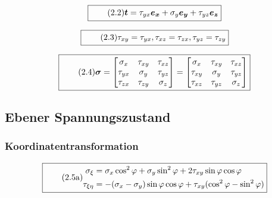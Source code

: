 \documentclass[11pt]{article}
\newcommand{\1}{ {\mathds{1}} }
\begin{document}
\begin{multicols}{2}
		\begin{equation}
			\boxed{
				\tag{2.2}
				\begin{split}
					\boldsymbol{t}
					=
					\tau_{yx} \boldsymbol{e_x}
					+
					\sigma_y	\boldsymbol{e_y}
					+
					\tau_{yz} \boldsymbol{e_z}
				\end{split}
			}
		\end{equation}

		\begin{equation}
			\boxed{
				\tag{2.3}
				\begin{split}
					\tau_{xy} = \tau_{yx},
					\tau_{xz} = \tau_{zx},
					\tau_{yz} = \tau_{zy}
				\end{split}
			}
		\end{equation}
		
		\begin{equation}
			\boxed{
				\tag{2.4}
				\begin{split}
					\boldsymbol{\sigma}
					=
					\begin{bmatrix*}
						\sigma_{x} & \tau_{xy}	& \tau_{xz} \\
						\tau_{yx}	& \sigma_{y} & \tau_{yz} \\
						\tau_{zx}	& \tau_{zy}	& \sigma_{z}
					\end{bmatrix*}
					=
					\begin{bmatrix*}
						\sigma_{x} & \tau_{xy}	& \tau_{xz} \\
						\tau_{xy}	& \sigma_{y} & \tau_{yz} \\
						\tau_{xz}	& \tau_{yz}	& \sigma_{z}
					\end{bmatrix*}					
				\end{split}
			}
		\end{equation}

		\subsection{Ebener Spannungszustand}
		
		\subsubsection{Koordinatentransformation}

		\begin{equation}
			\boxed{
				\tag{2.5a}
				\begin{split}
					\sigma_{\xi} &= \sigma_x \cos^2 \varphi + \sigma_y \sin^2\varphi + 2 \tau_{xy} \sin\varphi \cos\varphi\\
					\tau_{\xi \eta} &= -(\sigma_x - \sigma_y) \sin \varphi \cos \varphi + \tau_{xy} (\cos^2\varphi - \sin^2\varphi)
				\end{split}
			}
		\end{equation}
	 

\end{multicols}
\end{document}
